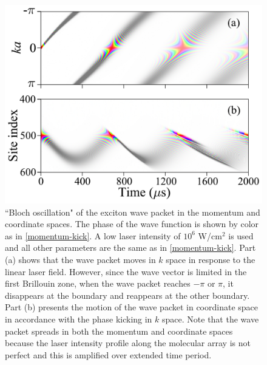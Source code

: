 \begin{figure}[htbp]
\centering
\includegraphics[width=\linewidth]{bloch-osci.pdf}
\caption{``Bloch oscillation" of the exciton wave
packet in the momentum and coordinate spaces. The phase of the
wave function is shown by color as in  \autoref{momentum-kick}. A low laser intensity of $10^6$
W/cm$^2$ is used and all other parameters are the same as in
\autoref{momentum-kick}. Part (a) shows that the wave packet moves in $k$ space
in response to the linear laser field. However, since the wave vector is limited in the first Brillouin zone,
when the wave packet reaches $-\pi$ or $\pi$, it disappears at the boundary and reappears at the other 
boundary. Part (b) presents the motion of the wave packet in coordinate space in accordance with the phase
kicking in $k$ space. Note that the wave packet  spreads in both the momentum and coordinate spaces
because the laser intensity profile along the molecular array is not perfect and this is amplified over extended
time period. 
} 
\label{bloch-osci}
\end{figure}

